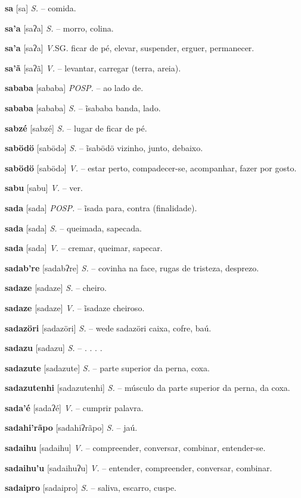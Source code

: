 \textbf{sa} [sa] \textit{S.} -- comida.

\textbf{sa'a} [saʔa] \textit{S.} -- morro, colina.

\textbf{sa'a} [saʔa] \textit{V.}SG. ficar de pé, elevar, suspender, erguer, permanecer.

\textbf{sa'ã} [saʔã] \textit{V.} -- levantar, carregar (terra, areia).

\textbf{sababa} [sababa] \textit{POSP.} -- ao lado de.

\textbf{sababa} [sababa] \textit{S.} -- ĩsababa banda, lado.

\textbf{sabzé} [sabzé] \textit{S.} -- lugar de ficar de pé.

\textbf{sabödö} [sabödə] \textit{S.} -- ĩsabödö vizinho, junto, debaixo.

\textbf{sabödö} [sabödə] \textit{V.} -- estar perto, compadecer-se, acompanhar, fazer por gosto.

\textbf{sabu} [sabu] \textit{V.} -- ver.

\textbf{sada} [sada] \textit{POSP.} -- ĩsada para, contra (finalidade).

\textbf{sada} [sada] \textit{S.} -- queimada, sapecada.

\textbf{sada} [sada] \textit{V.} -- cremar, queimar, sapecar.

\textbf{sadab're} [sadabʔre] \textit{S.} -- covinha na face, rugas de tristeza, desprezo.

\textbf{sadaze} [sadaze] \textit{S.} -- cheiro.

\textbf{sadaze} [sadaze] \textit{V.} -- ĩsadaze cheiroso.

\textbf{sadazöri} [sadazöri] \textit{S.} -- wede sadazöri caixa, cofre, baú.

\textbf{sadazu} [sadazu] \textit{S.} -- . . . .

\textbf{sadazute} [sadazute] \textit{S.} -- parte superior da perna, coxa.

\textbf{sadazutenhi} [sadazutenhi] \textit{S.} -- músculo da parte superior da perna, da coxa.

\textbf{sada'é} [sadaʔé] \textit{V.} -- cumprir palavra.

\textbf{sadahi'rãpo} [sadahiʔrãpo] \textit{S.} -- jaú.

\textbf{sadaihu} [sadaihu] \textit{V.} -- compreender, conversar, combinar, entender-se.

\textbf{sadaihu'u} [sadaihuʔu] \textit{V.} -- entender, compreender, conversar, combinar.

\textbf{sadaipro} [sadaipro] \textit{S.} -- saliva, escarro, cuspe.

